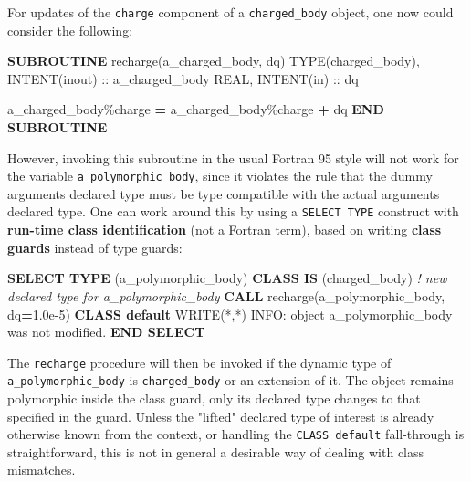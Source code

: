 \documentclass[]{scrartcl}
\newenvironment{Shaded}{}{}
\newcommand{\CommentTok}[1]{\textcolor[rgb]{0.38,0.63,0.69}{\textit{#1}}}
\newcommand{\DataTypeTok}[1]{\textcolor[rgb]{0.56,0.13,0.00}{#1}}
\newcommand{\FloatTok}[1]{\textcolor[rgb]{0.25,0.63,0.44}{#1}}
\newcommand{\FunctionTok}[1]{\textcolor[rgb]{0.02,0.16,0.49}{#1}}
\newcommand{\KeywordTok}[1]{\textcolor[rgb]{0.00,0.44,0.13}{\textbf{#1}}}
\newcommand{\NormalTok}[1]{#1}
\newcommand{\OperatorTok}[1]{\textcolor[rgb]{0.40,0.40,0.40}{#1}}
\newcommand{\StringTok}[1]{\textcolor[rgb]{0.25,0.44,0.63}{#1}}
\begin{document}
For updates of the \texttt{charge} component of a \texttt{charged\_body}
object, one now could consider the following:

\begin{Shaded}
\begin{Highlighting}[]
\KeywordTok{SUBROUTINE}\NormalTok{ recharge(a\_charged\_body, dq)}
   \DataTypeTok{TYPE(charged\_body)}\NormalTok{, }\DataTypeTok{INTENT(inout)} \DataTypeTok{::}\NormalTok{ a\_charged\_body}
   \DataTypeTok{REAL}\NormalTok{, }\DataTypeTok{INTENT(in)} \DataTypeTok{::}\NormalTok{ dq}

\NormalTok{   a\_charged\_body}\OperatorTok{\%}\NormalTok{charge }\KeywordTok{=}\NormalTok{ a\_charged\_body}\OperatorTok{\%}\NormalTok{charge }\KeywordTok{+}\NormalTok{ dq}
\KeywordTok{END SUBROUTINE}
\end{Highlighting}
\end{Shaded}

However, invoking this subroutine in the usual Fortran 95 style will not
work for the variable \texttt{a\_polymorphic\_body}, since it violates
the rule that the dummy argument\textquotesingle s declared type must be
type compatible with the actual argument\textquotesingle s declared
type. One can work around this by using a \texttt{SELECT\ TYPE}
construct with \textbf{run-time class identification} (not a Fortran
term), based on writing \textbf{class guards} instead of type guards:

\begin{Shaded}
\begin{Highlighting}[]
\KeywordTok{SELECT TYPE}\NormalTok{ (a\_polymorphic\_body)}
\KeywordTok{CLASS IS}\NormalTok{ (charged\_body)  }\CommentTok{! new declared type for a\_polymorphic\_body}
   \KeywordTok{CALL}\NormalTok{ recharge(a\_polymorphic\_body, dq}\KeywordTok{=}\FloatTok{1.0e{-}5}\NormalTok{)}
\KeywordTok{CLASS default}
   \FunctionTok{WRITE(*}\NormalTok{,}\FunctionTok{*)} \StringTok{\textquotesingle{}INFO: object a\_polymorphic\_body was not modified.\textquotesingle{}}
\KeywordTok{END SELECT}
\end{Highlighting}
\end{Shaded}

The \texttt{recharge} procedure will then be invoked if the dynamic type
of \texttt{a\_polymorphic\_body} is \texttt{charged\_body} or an
extension of it. The object remains polymorphic inside the class guard,
only its declared type changes to that specified in the guard. Unless
the "lifted" declared type of interest is already otherwise known from
the context, or handling the \texttt{CLASS\ default} fall-through is
straightforward, this is not in general a desirable way of dealing with
class mismatches.
\end{document}
